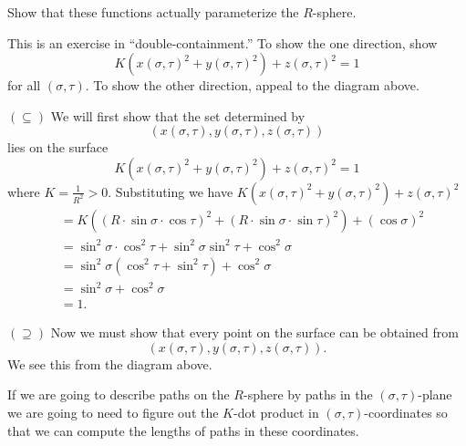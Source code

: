 \documentclass{ximera}
\begin{document}
\begin{problem}
  Show that these functions actually parameterize the $R$-sphere.
\begin{hint}
This is an exercise in ``double-containment.'' To show the one direction, show
\[
K\left(x(\sigma,\tau) ^{2}+y(\sigma,\tau) ^{2}\right) +z(\sigma,\tau)^{2} = 1
\]
for all $(\sigma,\tau)$. To show the other direction, appeal to the
diagram above.
\end{hint}
\begin{freeResponse}
  $(\subseteq)$ We will first show that the set determined by
  \[
  \left(x(\sigma,\tau), y(\sigma,\tau), z(\sigma,\tau)\right)
  \]
  lies on the surface
  \[
  K\left(x(\sigma,\tau) ^{2}+y(\sigma,\tau) ^{2}\right) +z(\sigma,\tau)^{2} = 1
  \]
  where $K=\frac{1}{R^2}>0$. Substituting we have
  $K\left(x(\sigma,\tau) ^{2}+y(\sigma,\tau) ^{2}\right)
  +z(\sigma,\tau)^{2}$
  \begin{align*}
    &=K\left((R\cdot\sin\sigma\cdot\cos\tau)^{2}+(R\cdot\sin\sigma\cdot\sin\tau)^{2}\right) +(\cos\sigma)^{2} \\
    &= \sin^2\sigma\cdot\cos^2\tau+\sin^2\sigma\sin^2\tau + \cos^2\sigma \\
    &= \sin^2\sigma(\cos^2\tau+\sin^2\tau) + \cos^2\sigma \\
    &= \sin^2\sigma + \cos^2\sigma \\
    &=1.
  \end{align*}

  $(\supseteq)$ Now we must show that every point on the surface can be obtained from
  \[
  \left(x(\sigma,\tau), y(\sigma,\tau), z(\sigma,\tau)\right).
  \]
  We see this from the diagram above. 
\end{freeResponse}
\end{problem}




If we are going to describe paths on the $R$-sphere by paths in the
$(\sigma,\tau)$-plane we are going to need to figure out the $K$-dot
product in $(\sigma,\tau)$-coordinates so that we can compute the
lengths of paths in these coordinates.
\end{document}
